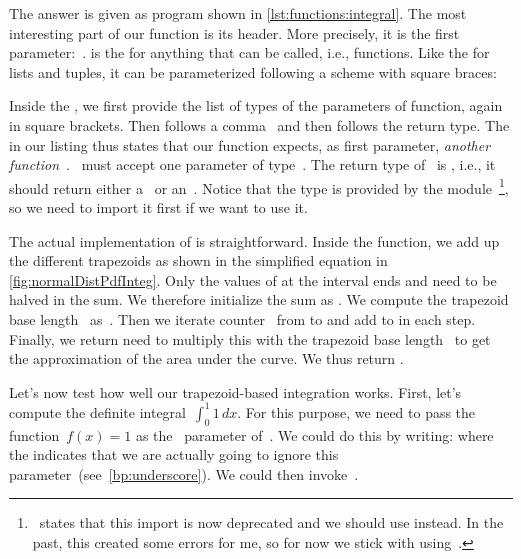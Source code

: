 The answer is given as program  shown in \cref{lst:functions:integral}.
The most interesting part of our  function is its header.
More precisely, it is the first parameter:~.
 is the  for anything that can be called, i.e., functions.
Like the  for lists and tuples, it can be parameterized following a scheme with square braces:%
%
%
%
\begin{sloppypar}%
Inside the , we first provide the list of types of the parameters of function, again in square brackets.
Then follows a comma~\pythonil{,} and then follows the return type.
The  in our listing thus states that our function  expects, as first parameter, \emph{another function}~.
~must accept one parameter of type~.
The return type of~ is , i.e., it should return either a~ or an~.
Notice that the type  is provided by the module~\footnote{%
\cite{PSF:P3D:TPSL:ACO}~states that this import is now deprecated and we should use  instead. %
In the past, this created some errors for me, so for now we stick with using~.}, %
so we need to import it first if we want to use it.%
\end{sloppypar}%
%
The actual implementation of  is straightforward.
Inside the function, we add up the different trapezoids as shown in the simplified equation in \cref{fig:normalDistPdfInteg}.
Only the values of  at the interval ends  and  need to be halved in the sum.
We therefore initialize the sum  as .
We compute the trapezoid base length~ as~.
Then we iterate counter~ from  to  and add  to  in each step.
Finally, we return need to multiply this with the trapezoid base length~ to get the approximation of the area under the curve.
We thus return .

Let's now test how well our trapezoid-based integration works.
First, let's compute the definite integral~$\int_0^1 1\,dx$.
For this purpose, we need to pass the function~$f(x)=1$ as the~ parameter of~.
We could do this by writing:%
%
%
%
where the \pythonil{_}\pythonIdx{\_} indicates that we are actually going to ignore this parameter~(see~\cref{bp:underscore}).
We could then invoke~.

